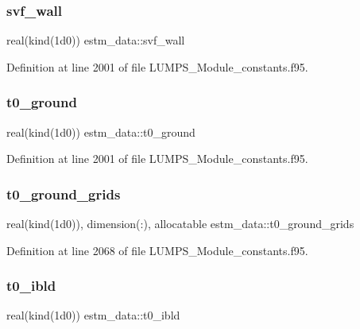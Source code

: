 \subsubsection{\texorpdfstring{svf\+\_\+wall}{svf\_wall}}
{\footnotesize\ttfamily real(kind(1d0)) estm\+\_\+data\+::svf\+\_\+wall}



Definition at line 2001 of file L\+U\+M\+P\+S\+\_\+\+Module\+\_\+constants.\+f95.

\mbox{\label{namespaceestm__data_a2dbe0d9dc5c526a806a724c6b200a172}} 
\subsubsection{\texorpdfstring{t0\+\_\+ground}{t0\_ground}}
{\footnotesize\ttfamily real(kind(1d0)) estm\+\_\+data\+::t0\+\_\+ground}



Definition at line 2001 of file L\+U\+M\+P\+S\+\_\+\+Module\+\_\+constants.\+f95.

\mbox{\label{namespaceestm__data_a140b49398b8c4930bdb307f71603c827}} 
\subsubsection{\texorpdfstring{t0\+\_\+ground\+\_\+grids}{t0\_ground\_grids}}
{\footnotesize\ttfamily real(kind(1d0)), dimension(\+:), allocatable estm\+\_\+data\+::t0\+\_\+ground\+\_\+grids}



Definition at line 2068 of file L\+U\+M\+P\+S\+\_\+\+Module\+\_\+constants.\+f95.

\mbox{\label{namespaceestm__data_a37971a0ee2a83ac906b6ae92bfc91f7d}} 
\subsubsection{\texorpdfstring{t0\+\_\+ibld}{t0\_ibld}}
{\footnotesize\ttfamily real(kind(1d0)) estm\+\_\+data\+::t0\+\_\+ibld}



